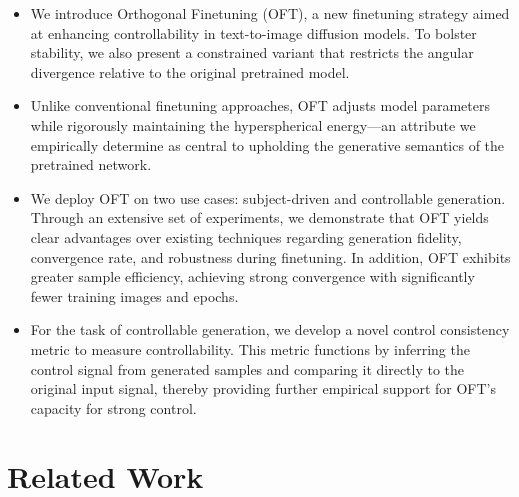 \begin{itemize}[leftmargin=*,nosep]

    \item We introduce Orthogonal Finetuning (OFT), a new finetuning strategy aimed at enhancing controllability in text-to-image diffusion models. To bolster stability, we also present a constrained variant that restricts the angular divergence relative to the original pretrained model.
    \item Unlike conventional finetuning approaches, OFT adjusts model parameters while rigorously maintaining the hyperspherical energy—an attribute we empirically determine as central to upholding the generative semantics of the pretrained network.
    \item We deploy OFT on two use cases: subject-driven and controllable generation. Through an extensive set of experiments, we demonstrate that OFT yields clear advantages over existing techniques regarding generation fidelity, convergence rate, and robustness during finetuning. In addition, OFT exhibits greater sample efficiency, achieving strong convergence with significantly fewer training images and epochs.
    \item For the task of controllable generation, we develop a novel control consistency metric to measure controllability. This metric functions by inferring the control signal from generated samples and comparing it directly to the original input signal, thereby providing further empirical support for OFT’s capacity for strong control.
\end{itemize}

\section{Related Work}

